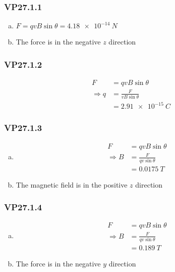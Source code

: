 \documentclass{article}
\begin{document}
\subsubsection{VP27.1.1}

\begin{enumerate}[(a)]
  \item $F = q v B \sin \theta = \qty{4.18e-14}{N}$

  \item The force is in the negative $z$ direction
\end{enumerate}

\subsubsection{VP27.1.2}

\begin{align*}
  F             & = q v B \sin \theta         \\
  \Rightarrow q & = \frac{F}{v B \sin \theta} \\
                & = \qty{2.91e-15}{C}
\end{align*}

\subsubsection{VP27.1.3}

\begin{enumerate}[(a)]
  \item

        \begin{align*}
          F             & = q v B \sin \theta         \\
          \Rightarrow B & = \frac{F}{q v \sin \theta} \\
                        & = \qty{0.0175}{T}
        \end{align*}

  \item The magnetic field is in the positive $z$ direction
\end{enumerate}

\subsubsection{VP27.1.4}

\begin{enumerate}[(a)]
  \item

        \begin{align*}
          F             & = q v B \sin \theta         \\
          \Rightarrow B & = \frac{F}{q v \sin \theta} \\
                        & = \qty{0.189}{T}
        \end{align*}

  \item The force is in the negative $y$ direction
\end{enumerate}
\end{document}

